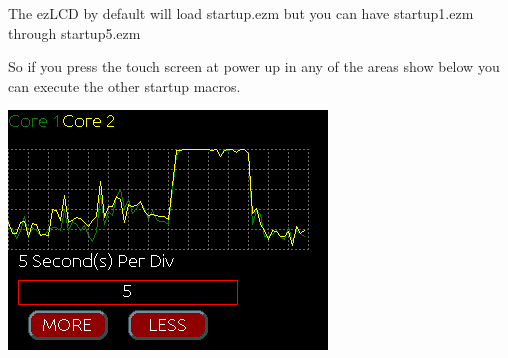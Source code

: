  The ez\-L\-C\-D by default will load startup.\-ezm but you can have startup1.\-ezm through startup5.\-ezm \par
 So if you press the touch screen at power up in any of the areas show below you can execute the other startup macros.\par
  
\begin{DoxyImageNoCaption}
  \mbox{\includegraphics{load.png}}
\end{DoxyImageNoCaption}
